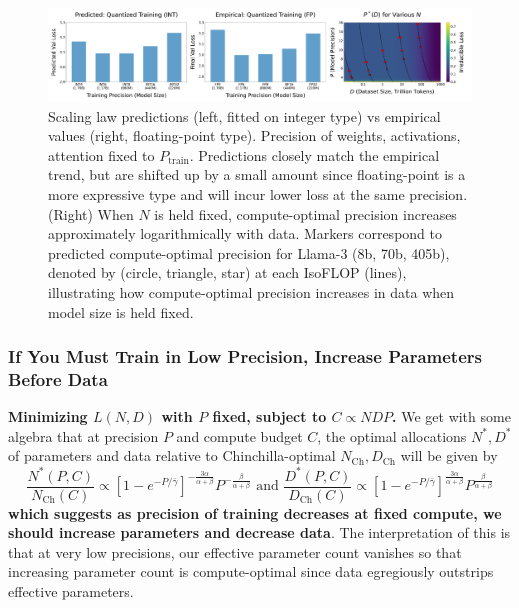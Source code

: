 \documentclass[11pt]{article}
\begin{document}
\begin{figure}
    \centering
    \includegraphics[width=\linewidth]{new_fig_6_new_evals.pdf} %
    \caption{Scaling law predictions (left, fitted on integer type) vs empirical values (right, floating-point type). Precision of weights, activations, attention fixed to $P_\text{train}$. Predictions closely match the empirical trend, but are shifted up by a small amount since floating-point is a more expressive type and will incur lower loss at the same precision. (Right) When $N$ is held fixed, compute-optimal precision increases approximately logarithmically with data. Markers correspond to predicted compute-optimal precision for Llama-3 (8b, 70b, 405b), denoted by (circle, triangle, star) at each IsoFLOP (lines), illustrating how compute-optimal precision increases in data when model size is held fixed.}
    \label{fig:pretraining-plots}
\end{figure}

\subsubsection{If You Must Train in Low Precision, Increase Parameters Before Data}

\textbf{Minimizing $L(N, D)$ with $P$ fixed, subject to $C \propto NDP$.} We get with some algebra that at precision $P$ and compute budget $C$, the optimal allocations $N^*, D^*$ of parameters and data relative to Chinchilla-optimal $N_{\text{Ch}}, D_{\text{Ch}}$ will be given by 
    \begin{equation}
    \label{eqn: N(P)-top}
        \frac{N^*(P, C)}{N_{\text{Ch}}(C)} \propto \left[1-e^{-P/\bar{\gamma}}\right]^{-\frac{3\alpha}{\alpha + \beta}} P^{-\frac{\beta}{\alpha + \beta}} \text{  and  } \frac{D^*(P, C)}{D_{\text{Ch}}(C)} \propto \left[1-e^{-P/\bar{\gamma}}\right]^{\frac{3\alpha}{\alpha + \beta}} P^{ \frac{\beta}{\alpha + \beta}}
    \end{equation}
%
    \textbf{which suggests as precision of training decreases at fixed compute, we should increase parameters and decrease data}. The interpretation of this is that at very low precisions, our effective parameter count vanishes so that increasing parameter count is compute-optimal since data egregiously outstrips effective parameters.
    
\end{document}
